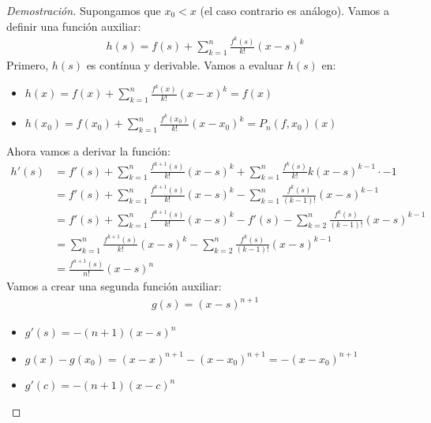 \documentclass{article}
\begin{document}
\begin{proof}[Demostración]
    Supongamos que $x_{0}<x$ (el caso contrario es análogo). Vamos a definir una función
    auxiliar:
    \begin{equation}
        \begin{split}
            h(s)= f(s) + \sum ^n_{k=1} \frac{f^k (s)}{k!}(x-s)^{k}
        \end{split}
    \end{equation}
    Primero, $h(s)$ es contínua y derivable. Vamos a evaluar $h(s)$ en:
    \begin{itemize}
        \item $h(x)=f(x) + \sum ^n_{k=1} \frac{f^k (x)}{k!}(x-x)^{k}=f(x)$
        \item $h(x_{0})=f(x_{0})+\sum ^n_{k=1} \frac{f^k (x_{0})}{k!}(x-x_{0})^{k}= P_{n}(f,x_{0})(x)$
    \end{itemize}
    Ahora vamos a derivar la función:
    \begin{equation}
        \begin{split}
            h'(s) &= f'(s)+ \sum _{k=1} ^n \frac{f^{k+1}(s)}{k!} (x-s)^{k} +\sum ^n_{k=1}
            \frac{f^k (s)}{k!}k(x-s)^{k-1}\cdot -1\\
            &= f'(s)+ \sum _{k=1} ^n \frac{f^{k+1}(s)}{k!} (x-s)^{k} - 
            \sum ^n_{k=1} \frac{f^k (s)}{(k-1)!}(x-s)^{k-1}\\
            &= f'(s) + \sum _{k=1} ^n \frac{f^{k+1}(s)}{k!} (x-s)^{k} -
            f'(s ) -\sum ^n_{k=2} \frac{f^k (s)}{(k-1)!}(x-s)^{k-1}\\
            &= \sum _{k=1} ^n \frac{f^{k+1}(s)}{k!} (x-s)^{k}-\sum ^n_{k=2} \frac{f^k (s)}{(k-1)!}(x-s)^{k-1}\\
            &= \frac{f^{n+1}(s)}{n!}(x-s)^{n}
        \end{split}
    \end{equation}
    Vamos a crear una segunda función auxiliar:
    \begin{equation}
        \begin{split}
            g(s)= (x-s)^{n+1}
        \end{split}
    \end{equation}
    \begin{itemize}
        \item $g'(s)=-(n+1)(x-s)^{n}$
        \item $g(x) -g(x_{0})= (x-x)^{n+1} - (x-x_{0})^{n+1}= - (x-x_{0})^{n+1}$
        \item $g'(c)= -(n+1)(x-c)^{n}$

\end{itemize}
\end{proof}
\end{document}
